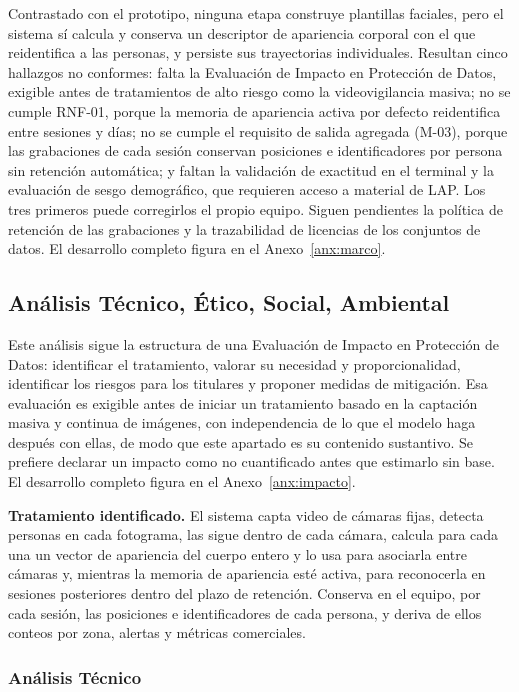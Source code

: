 Contrastado con el prototipo, ninguna etapa construye plantillas faciales, pero el sistema sí
calcula y conserva un descriptor de apariencia corporal con el que reidentifica a las personas, y
persiste sus trayectorias individuales. Resultan cinco hallazgos no conformes: falta la
Evaluación de Impacto en Protección de Datos, exigible antes de tratamientos de alto riesgo
como la videovigilancia masiva; no se cumple RNF-01, porque la memoria de apariencia activa
por defecto reidentifica entre sesiones y días; no se cumple el requisito de salida agregada
(M-03), porque las grabaciones de cada sesión conservan posiciones e identificadores por
persona sin retención automática; y faltan la validación de exactitud en el terminal y la
evaluación de sesgo demográfico, que requieren acceso a material de LAP. Los tres primeros
puede corregirlos el propio equipo. Siguen pendientes la política de retención de las
grabaciones y la trazabilidad de licencias de los conjuntos de datos. El desarrollo completo
figura en el Anexo~\ref{anx:marco}.

\subsection{Análisis Técnico, Ético, Social, Ambiental}
\label{subsec:analisis-teas}

Este análisis sigue la estructura de una Evaluación de Impacto en Protección de Datos:
identificar el tratamiento, valorar su necesidad y proporcionalidad, identificar los riesgos para
los titulares y proponer medidas de mitigación. Esa evaluación es exigible antes de iniciar un
tratamiento basado en la captación masiva y continua de imágenes, con independencia de lo
que el modelo haga después con ellas, de modo que este apartado es su contenido sustantivo.
Se prefiere declarar un impacto como no cuantificado antes que estimarlo sin base. El
desarrollo completo figura en el Anexo~\ref{anx:impacto}.

\textbf{Tratamiento identificado.} El sistema capta video de cámaras fijas, detecta personas en
cada fotograma, las sigue dentro de cada cámara, calcula para cada una un vector de apariencia
del cuerpo entero y lo usa para asociarla entre cámaras y, mientras la memoria de apariencia
esté activa, para reconocerla en sesiones posteriores dentro del plazo de retención. Conserva
en el equipo, por cada sesión, las posiciones e identificadores de cada persona, y deriva de ellos
conteos por zona, alertas y métricas comerciales.

\subsubsection{Análisis Técnico}

